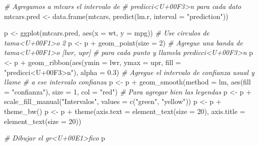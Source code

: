 \documentclass[
  12pt,
]{book}
\newenvironment{Shaded}{\begin{snugshade}}{\end{snugshade}}
\newcommand{\AttributeTok}[1]{\textcolor[rgb]{0.77,0.63,0.00}{#1}}
\newcommand{\CommentTok}[1]{\textcolor[rgb]{0.56,0.35,0.01}{\textit{#1}}}
\newcommand{\DecValTok}[1]{\textcolor[rgb]{0.00,0.00,0.81}{#1}}
\newcommand{\FloatTok}[1]{\textcolor[rgb]{0.00,0.00,0.81}{#1}}
\newcommand{\FunctionTok}[1]{\textcolor[rgb]{0.00,0.00,0.00}{#1}}
\newcommand{\NormalTok}[1]{#1}
\newcommand{\OtherTok}[1]{\textcolor[rgb]{0.56,0.35,0.01}{#1}}
\newcommand{\SpecialCharTok}[1]{\textcolor[rgb]{0.00,0.00,0.00}{#1}}
\newcommand{\StringTok}[1]{\textcolor[rgb]{0.31,0.60,0.02}{#1}}
\begin{document}
\begin{Shaded}
\begin{Highlighting}[]
\CommentTok{\# Agregamos a mtcars el intervalo de}
\CommentTok{\# predicci\textless{}U+00F3\textgreater{}n para cada dato}
\NormalTok{mtcars.pred }\OtherTok{\textless{}{-}} \FunctionTok{data.frame}\NormalTok{(mtcars, }\FunctionTok{predict}\NormalTok{(lm.r, }\AttributeTok{interval =} \StringTok{"prediction"}\NormalTok{))}

\NormalTok{p }\OtherTok{\textless{}{-}} \FunctionTok{ggplot}\NormalTok{(mtcars.pred, }\FunctionTok{aes}\NormalTok{(}\AttributeTok{x =}\NormalTok{ wt, }\AttributeTok{y =}\NormalTok{ mpg))}
\CommentTok{\# Use circulos de tama\textless{}U+00F1\textgreater{}o 2}
\NormalTok{p }\OtherTok{\textless{}{-}}\NormalTok{ p }\SpecialCharTok{+} \FunctionTok{geom\_point}\NormalTok{(}\AttributeTok{size =} \DecValTok{2}\NormalTok{)}
\CommentTok{\# Agregue una banda de tama\textless{}U+00F1\textgreater{}o [lwr, upr]}
\CommentTok{\# para cada punto y llamela \textquotesingle{}predicci\textless{}U+00F3\textgreater{}n\textquotesingle{}}
\NormalTok{p }\OtherTok{\textless{}{-}}\NormalTok{ p }\SpecialCharTok{+} \FunctionTok{geom\_ribbon}\NormalTok{(}\FunctionTok{aes}\NormalTok{(}\AttributeTok{ymin =}\NormalTok{ lwr, }\AttributeTok{ymax =}\NormalTok{ upr, }\AttributeTok{fill =} \StringTok{"predicci\textless{}U+00F3\textgreater{}n"}\NormalTok{),}
    \AttributeTok{alpha =} \FloatTok{0.3}\NormalTok{)}
\CommentTok{\# Agregue el intervalo de confianza usual y llame}
\CommentTok{\# a ese intervalo \textquotesingle{}confianza\textquotesingle{}}
\NormalTok{p }\OtherTok{\textless{}{-}}\NormalTok{ p }\SpecialCharTok{+} \FunctionTok{geom\_smooth}\NormalTok{(}\AttributeTok{method =}\NormalTok{ lm, }\FunctionTok{aes}\NormalTok{(}\AttributeTok{fill =} \StringTok{"confianza"}\NormalTok{),}
    \AttributeTok{size =} \DecValTok{1}\NormalTok{, }\AttributeTok{col =} \StringTok{"red"}\NormalTok{)}
\CommentTok{\# Para agregar bien las leyendas}
\NormalTok{p }\OtherTok{\textless{}{-}}\NormalTok{ p }\SpecialCharTok{+} \FunctionTok{scale\_fill\_manual}\NormalTok{(}\StringTok{"Intervalos"}\NormalTok{, }\AttributeTok{values =} \FunctionTok{c}\NormalTok{(}\StringTok{"green"}\NormalTok{,}
    \StringTok{"yellow"}\NormalTok{))}
\NormalTok{p }\OtherTok{\textless{}{-}}\NormalTok{ p }\SpecialCharTok{+} \FunctionTok{theme\_bw}\NormalTok{()}
\NormalTok{p }\OtherTok{\textless{}{-}}\NormalTok{ p }\SpecialCharTok{+} \FunctionTok{theme}\NormalTok{(}\AttributeTok{axis.text =} \FunctionTok{element\_text}\NormalTok{(}\AttributeTok{size =} \DecValTok{20}\NormalTok{),}
    \AttributeTok{axis.title =} \FunctionTok{element\_text}\NormalTok{(}\AttributeTok{size =} \DecValTok{20}\NormalTok{))}

\CommentTok{\# Dibujar el gr\textless{}U+00E1\textgreater{}fico}
\NormalTok{p}
\end{Highlighting}
\end{Shaded}
\end{document}
